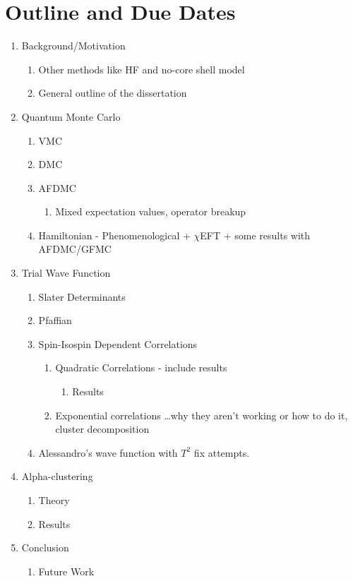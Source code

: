 {\small
\section*{Outline and Due Dates}
\begin{enumerate}
   \item Background/Motivation
   \begin{enumerate}
      \item Other methods like HF and no-core shell model
      \item General outline of the dissertation
   \end{enumerate}
   \item Quantum Monte Carlo
   \begin{enumerate}
      \item VMC
      \item DMC
      \item AFDMC
      \begin{enumerate}
         \item Mixed expectation values, operator breakup
      \end{enumerate}
      \item Hamiltonian - Phenomenological + $\chi$EFT + some results with AFDMC/GFMC
   \end{enumerate}
   \item Trial Wave Function
   \begin{enumerate}
      \item Slater Determinants
      \item Pfaffian
      \item Spin-Isospin Dependent Correlations
      \begin{enumerate}
         \item Quadratic Correlations - include results
         \begin{enumerate}
            \item Results
         \end{enumerate}
         \item Exponential correlations \ldots why they aren't working or how to do it, cluster decomposition
      \end{enumerate}
      \item Alessandro's wave function with $T^2$ fix attempts.
   \end{enumerate}
   \item Alpha-clustering
   \begin{enumerate}
      \item Theory
      \item Results
   \end{enumerate}
   \item Conclusion
   \begin{enumerate}
      \item Future Work
   \end{enumerate}
\end{enumerate}
}
